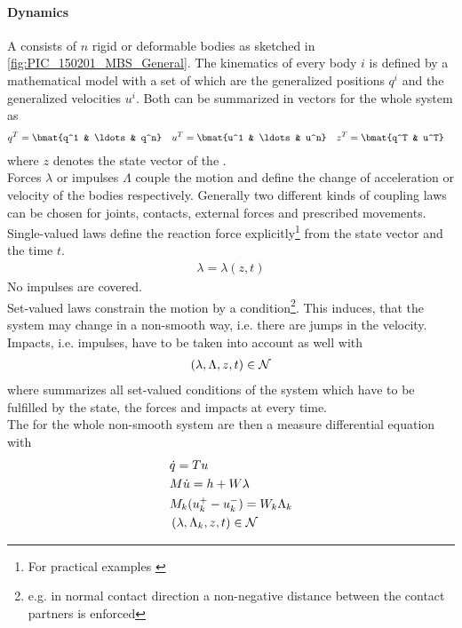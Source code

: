 \paragraph{Dynamics}
A \MBS consists of $n$ rigid or deformable bodies as sketched in \cref{fig:PIC_150201_MBS_General}.
The kinematics of every body $i$ is defined by a mathematical model with a set of \DOFs which are the generalized positions $q^i$ and the generalized velocities $u^i$.
Both can be summarized in vectors for the whole system as
%
\begin{align}
  \label{eq:GeneralizedPositionsAndVelocities}
  q^T &= \bmat{q^1 & \ldots & q^n} & u^T &= \bmat{u^1 & \ldots & u^n} & z^T &= \bmat{q^T  & u^T} 
\end{align}
%
where $z$ denotes the state vector of the \MBS.\\
Forces $\lambda$ or impulses $\Lambda$ couple the motion and define the change of acceleration or velocity of the bodies respectively.
Generally two different kinds of coupling laws can be chosen for joints, contacts, external forces and prescribed movements.\\
Single-valued laws define the reaction force explicitly\footnote{For practical examples \cite[p. 18]{forg_mehrkorpersysteme_2007}} from the state vector and the time $t$.
%
\begin{align}
  \label{eq:SingleValuedReactions}
  \lambda = \lambda(z,t)
\end{align}
%
No impulses are covered.\\
Set-valued laws constrain the motion by a condition\footnote{e.g. in normal contact direction a non-negative distance between the contact partners is enforced}.
This induces, that the system may change in a non-smooth way, i.e. there are jumps in the velocity.
Impacts, i.e. impulses, have to be taken into account as well with
%
\begin{align}
  \label{eq:SetValuedReactions}
  \left(\lambda,\Lambda,z,t\right) \in {\cal{N}}
\end{align}
%
where \NC summarizes all set-valued conditions of the system which have to be fulfilled by the state, the forces and impacts at every time.\\
The \EOMs for the whole non-smooth system are then a measure differential equation with
%
\begin{subequations}
  \label{eq:EOMsNonSmooth}
\begin{align}
  \label{eq:EOMsNonSmoothPos}
  &\dot{q} = T u\\
  \label{eq:EOMsNonSmoothVelSmooth}
  &M \dot{u} = h + W \lambda\\
  \label{eq:EOMsNonSmoothVelNonSmooth}
  &M_k (u^+_k - u^-_k) = W_k \Lambda_k\\
  \label{eq:EOMsNonSmoothNC}
  &\left(\lambda,\Lambda_k,z,t\right) \in {\cal{N}}
\end{align}
\end{subequations}
